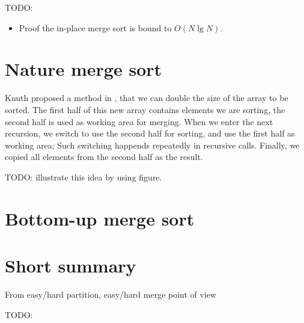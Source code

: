 \documentclass{article}
\begin{document}
TODO:

\begin{Exercise}
\begin{itemize}
\item Proof the in-place merge sort is bound to $O(N \lg N)$.
\end{itemize}
\end{Exercise}

\section{Nature merge sort}
Knuth proposed a method in \cite{TAOCP}, that we can double the size of the array to be sorted.
The first half of this new array contains elements we are sorting, the second half is used as
working area for merging. When we enter the next recursion, we switch to use the second half
for sorting, and use the first half as working area; Such switching happends repeatedly in
recursive calls. Finally, we copied all elements from the second half as the result.

TODO: illustrate this idea by using figure.

\section{Bottom-up merge sort}

\section{Short summary} 
From easy/hard partition, easy/hard merge point of view

TODO:
\end{document}
